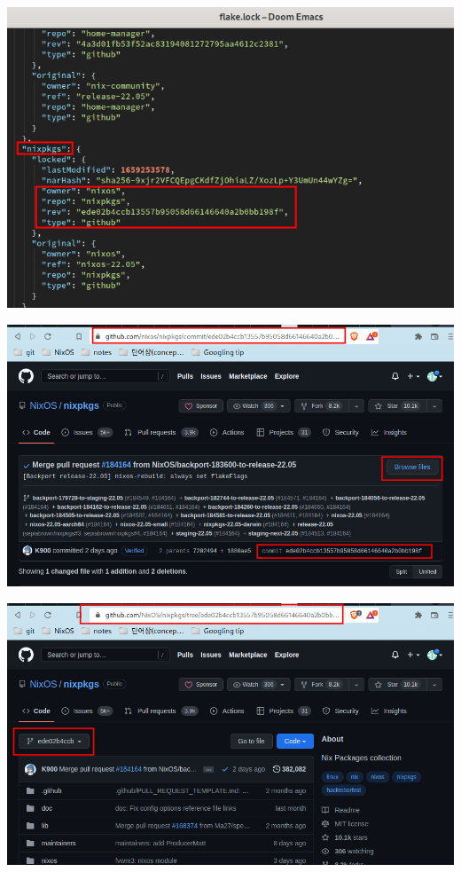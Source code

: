 \documentclass[a4paper,11pt]{article}
\begin{document}
\begin{center}
\includegraphics[width=.9\linewidth]{./img/3_nix/repo find from flake.lock.png}
\end{center}
\begin{center}
\includegraphics[width=.9\linewidth]{./img/3_nix/repo find from flake.lock2.png}
\end{center}
\begin{center}
\includegraphics[width=.9\linewidth]{./img/3_nix/repo find from flake.lock3.png}
\end{center}
\end{document}
